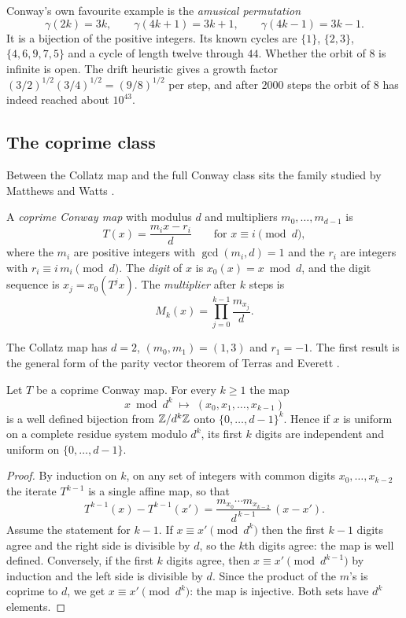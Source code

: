 Conway's own favourite example \cite{conway2013} is the \emph{amusical permutation}
\[
\gamma(2k)=3k,\qquad \gamma(4k+1)=3k+1,\qquad \gamma(4k-1)=3k-1 .
\]
It is a bijection of the positive integers. Its known cycles are $\{1\}$, $\{2,3\}$, $\{4,6,9,7,5\}$ and a cycle of length twelve through $44$. Whether the orbit of $8$ is infinite is open. The drift heuristic gives a growth factor $(3/2)^{1/2}(3/4)^{1/2}=(9/8)^{1/2}$ per step, and after $2000$ steps the orbit of $8$ has indeed reached about $10^{43}$.

\subsection{The coprime class}
Between the Collatz map and the full Conway class sits the family studied by Matthews and Watts \cite{matthews1984,matthews1985}.

\begin{definition}\label{rrt:def:mw}
A \emph{coprime Conway map} with modulus $d$ and multipliers $m_0,\dots,m_{d-1}$ is
\[
T(x)=\frac{m_i x - r_i}{d}\qquad\text{for } x\equiv i \pmod d ,
\]
where the $m_i$ are positive integers with $\gcd(m_i,d)=1$ and the $r_i$ are integers with $r_i\equiv i\,m_i \pmod d$. The \emph{digit} of $x$ is $x_0(x)=x \bmod d$, and the digit sequence is $x_j = x_0(T^j x)$. The \emph{multiplier} after $k$ steps is
\[
M_k(x)=\prod_{j=0}^{k-1}\frac{m_{x_j}}{d}.
\]
\end{definition}

The Collatz map has $d=2$, $(m_0,m_1)=(1,3)$ and $r_1=-1$. The first result is the general form of the parity vector theorem of Terras \cite{terras1976} and Everett \cite{everett1977}.

\begin{theorem}\label{rrt:thm:bijection}
Let $T$ be a coprime Conway map. For every $k\ge 1$ the map
\[
x \bmod d^k \;\longmapsto\; (x_0,x_1,\dots,x_{k-1})
\]
is a well defined bijection from $\mathbb{Z}/d^k\mathbb{Z}$ onto $\{0,\dots,d-1\}^k$. Hence if $x$ is uniform on a complete residue system modulo $d^k$, its first $k$ digits are independent and uniform on $\{0,\dots,d-1\}$.
\end{theorem}

\begin{proof}
By induction on $k$, on any set of integers with common digits $x_0,\dots,x_{k-2}$ the iterate $T^{k-1}$ is a single affine map, so that
\[
T^{k-1}(x)-T^{k-1}(x') = \frac{m_{x_0}\cdots m_{x_{k-2}}}{d^{\,k-1}}\,(x-x') .
\]
Assume the statement for $k-1$. If $x\equiv x' \pmod{d^k}$ then the first $k-1$ digits agree and the right side is divisible by $d$, so the $k$th digits agree: the map is well defined. Conversely, if the first $k$ digits agree, then $x\equiv x'\pmod{d^{k-1}}$ by induction and the left side is divisible by $d$. Since the product of the $m$'s is coprime to $d$, we get $x\equiv x' \pmod{d^k}$: the map is injective. Both sets have $d^k$ elements.
\end{proof}

